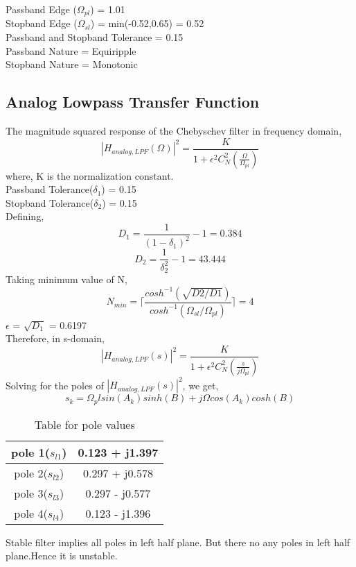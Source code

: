 \documentclass[12pt]{article}
\begin{document}
Passband Edge ($\Omega_{pl}$) = 1.01\\
Stopband Edge ($\Omega_{sl}$) = min(-0.52,0.65) = 0.52\\
Passband and Stopband Tolerance = 0.15\\
Passband Nature = Equiripple\\
Stopband Nature = Monotonic

\subsection{Analog Lowpass Transfer Function}
The magnitude squared response of the Chebyschev filter in frequency domain,
\begin{equation}
    |H_{analog,LPF}(\Omega)|^2 = \frac{K}{1 + \epsilon^2C_N^2(\frac{\Omega}{\Omega_{pl}})}
\end{equation}
where, K is the normalization constant.\\
Passband Tolerance($\delta_1$) = 0.15\\
Stopband Tolerance($\delta_2$) = 0.15\\
Defining,
\begin{equation}
    D_1 = \frac{1}{(1-\delta_1)^2}-1 = 0.384
\end{equation}
\begin{equation}
    D_2 = \frac{1}{\delta_2^2}-1 = 43.444 
\end{equation}
Taking minimum value of N,
\begin{equation}
    N_{min} = \lceil\frac{cosh^{-1}(\sqrt{D2/D1})}{cosh^{-1}(\Omega_{sl}/\Omega_{pl})}\rceil   = 4
\end{equation}
$\epsilon$ = $\sqrt{D_1}$ =  0.6197\\
Therefore, in s-domain,\\
\begin{equation}
    |H_{analog,LPF}(s)|^2 = \frac{K}{1 + \epsilon^2C_N^2(\frac{s}{j\Omega_{pl}})}
\end{equation}
Solving for the poles of $|H_{analog,LPF}(s)|^2$, we get,
\begin{equation}
    s_k = \Omega_pl sin(A_k)sinh(B) + j\Omega cos(A_k)cosh(B)
\end{equation}
\begin{table}[H]
\centering  %
\begin{tabular}{|c|c|}
\hline  %
pole 1($s_{l1}$)	&	 0.123 + j1.397	\\ \hline
pole 2($s_{l2}$)	&	 0.297 + j0.578   \\ \hline
pole 3($s_{l3}$)	&	 0.297 - j0.577   \\ \hline
pole 4($s_{l4}$)	&	 0.123 - j1.396   \\ \hline\hline    %
\end{tabular}
\caption{Table for pole values}
\end{table}
Stable filter implies all poles in left half plane. But there no any poles in left half plane.Hence it is unstable.
\end{document}
